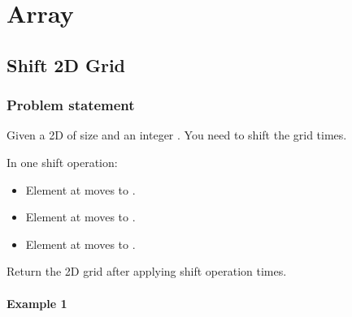 \documentclass[letterpaper,12pt,english]{book}
\begin{document}
\sphinxstepscope


\chapter{Array}
\label{\detokenize{Array/index:array}}\label{\detokenize{Array/index::doc}}
\sphinxstepscope


\section{Shift 2D Grid}
\label{\detokenize{Array/01_ARR_1260_Shift_2D_Grid:shift-2d-grid}}\label{\detokenize{Array/01_ARR_1260_Shift_2D_Grid::doc}}

\subsection{Problem statement\sphinxfootnotemark[3]}
\label{\detokenize{Array/01_ARR_1260_Shift_2D_Grid:problem-statement}}%
\begin{footnotetext}[3]\sphinxAtStartFootnote
{}
%
\end{footnotetext}\ignorespaces 
\sphinxAtStartPar
Given a 2D  of size  and an integer . You need to shift the grid  times.

\sphinxAtStartPar
In one shift operation:
\begin{itemize}
\item {} 
\sphinxAtStartPar
Element at  moves to .

\item {} 
\sphinxAtStartPar
Element at  moves to .

\item {} 
\sphinxAtStartPar
Element at  moves to .

\end{itemize}

\sphinxAtStartPar
Return the 2D grid after applying shift operation  times.


\subsubsection{Example 1}
\label{\detokenize{Array/01_ARR_1260_Shift_2D_Grid:example-1}}
\sphinxAtStartPar
{}
\end{document}
